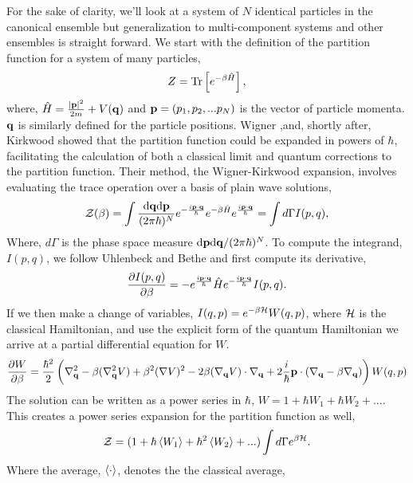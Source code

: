 For the sake of clarity, we'll look at a system of $N$ identical particles in
the canonical ensemble but generalization to multi-component systems and other
ensembles is straight forward.  We start with the definition of the partition
function for a system of many particles,  
%
\begin{equation} Z = \mathrm{Tr}\left[ e^{-\beta\hat{H}} \right], \end{equation} 
%
where, $\hat{H} = \frac{\vert\mathbf{p}\vert^2}{2m} + V(\mathbf{q})$ and $\mathbf{p} = (p_1, p_2, ...p_N)$
is the vector of particle momenta.  $\mathbf{q}$ is similarly defined for the particle
positions.  Wigner \cite{PhysRev.40.749},and, shortly after, Kirkwood
\cite{PhysRev.44.31} showed that the partition function could be expanded in
powers of $\hbar$, facilitating the calculation of both a classical limit and
quantum corrections to the partition function.  Their method, the
Wigner-Kirkwood expansion, involves evaluating the trace operation over a basis
of plain wave solutions,
%
\begin{equation} \mathcal{Z}(\beta) = \int \frac{\mathrm{d}\mathbf{q} \mathrm{d}\mathbf{p}}{(2\pi \hbar)^N}
e^{-\frac{i\mathbf{p}\cdot\mathbf{q}}{\hbar}} e^{-\beta \hat{H}} e^{\frac{i\mathbf{p}\cdot\mathbf{q}}{\hbar}} =
\int d\Gamma I(p, q), \end{equation}
%
Where, $d\Gamma$ is the phase space measure
$\mathrm{d}\mathbf{p}\mathrm{d}\mathbf{q}/(2\pi\hbar)^N$.  To compute the integrand, $I(p, q)$,
we follow Uhlenbeck and Bethe \cite{Uhlenbeck1936729} and first compute its
derivative,
%
\begin{equation} \frac{\partial I(p, q)}{\partial \beta} = -e^{\frac{i\mathbf{p}\cdot\mathbf{q}}{\hbar}}\hat{H}e^{-\frac{i\mathbf{p}\cdot\mathbf{q}}{\hbar}}
I(p, q).  \end{equation}
%
If we then make a change of variables, $I(q, p) = e^{-\beta\mathcal{H}}W(q, p)$, where
$\mathcal{H}$ is the classical Hamiltonian, and use the explicit form of the quantum
Hamiltonian we arrive at a partial differential equation for $W$.
%
\begin{equation} \frac{\partial W}{\partial \beta} = \frac{\hbar^2}{2} \left(
\nabla_{\mathbf{q}}^2 - \beta(\nabla_{\mathbf{q}}^2V) + \beta^2(\nabla V)^2 -
2\beta(\nabla_{\mathbf{q}} V)\cdot\nabla_{\mathbf{q}} + 2 \frac{i}{\hbar}\mathbf{p}\cdot(\nabla_{\mathbf{q}} -
\beta\nabla_{\mathbf{q}}) \right)W(q, p) \end{equation}
%
The solution can be written as a power series in $\hbar$, $W = 1 + \hbar W_1 +
\hbar W_2 + ...$.  This creates a power series expansion for the partition
function as well,
%
\begin{equation} \mathcal{Z} = (1 + \hbar \left\langle W_1 \right\rangle + \hbar^2 \left\langle W_2 \right\rangle+ ...)
\int d\Gamma e^{\beta\mathcal{H}}.  \end{equation}
%
Where the average, $\left\langle \cdot \right\rangle$, denotes the the classical average, 
